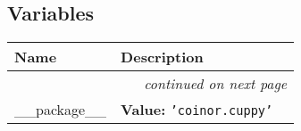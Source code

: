 
  \subsection{Variables}

    \vspace{-1cm}
\hspace{\varindent}\begin{longtable}{|p{\varnamewidth}|p{\vardescrwidth}|l}
\cline{1-2}
\cline{1-2} \centering \textbf{Name} & \centering \textbf{Description}& \\
\cline{1-2}
\endhead\cline{1-2}\multicolumn{3}{r}{\small\textit{continued on next page}}\\\endfoot\cline{1-2}
\endlastfoot\raggedright \_\-\_\-p\-a\-c\-k\-a\-g\-e\-\_\-\_\- & \raggedright \textbf{Value:} 
{\tt \texttt{'}\texttt{coinor.cuppy}\texttt{'}}&\\
\cline{1-2}
\end{longtable}

